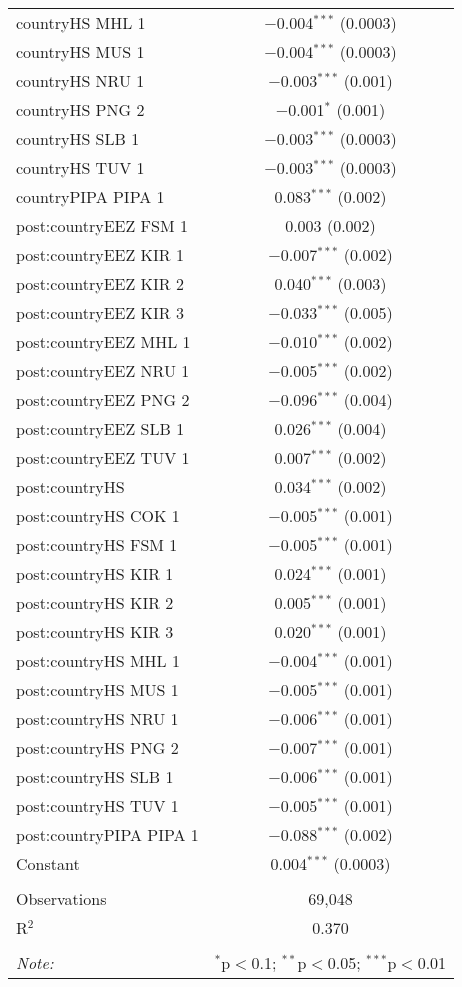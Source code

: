 \documentclass[11pt,]{article}
\begin{document}
\begin{table}[!htbp]
\begin{tabular}{@{\extracolsep{5pt}}lc}
  countryHS MHL 1 & $-$0.004$^{***}$ (0.0003) \\ 
  countryHS MUS 1 & $-$0.004$^{***}$ (0.0003) \\ 
  countryHS NRU 1 & $-$0.003$^{***}$ (0.001) \\ 
  countryHS PNG 2 & $-$0.001$^{*}$ (0.001) \\ 
  countryHS SLB 1 & $-$0.003$^{***}$ (0.0003) \\ 
  countryHS TUV 1 & $-$0.003$^{***}$ (0.0003) \\ 
  countryPIPA PIPA 1 & 0.083$^{***}$ (0.002) \\ 
  post:countryEEZ FSM 1 & 0.003 (0.002) \\ 
  post:countryEEZ KIR 1 & $-$0.007$^{***}$ (0.002) \\ 
  post:countryEEZ KIR 2 & 0.040$^{***}$ (0.003) \\ 
  post:countryEEZ KIR 3 & $-$0.033$^{***}$ (0.005) \\ 
  post:countryEEZ MHL 1 & $-$0.010$^{***}$ (0.002) \\ 
  post:countryEEZ NRU 1 & $-$0.005$^{***}$ (0.002) \\ 
  post:countryEEZ PNG 2 & $-$0.096$^{***}$ (0.004) \\ 
  post:countryEEZ SLB 1 & 0.026$^{***}$ (0.004) \\ 
  post:countryEEZ TUV 1 & 0.007$^{***}$ (0.002) \\ 
  post:countryHS & 0.034$^{***}$ (0.002) \\ 
  post:countryHS COK 1 & $-$0.005$^{***}$ (0.001) \\ 
  post:countryHS FSM 1 & $-$0.005$^{***}$ (0.001) \\ 
  post:countryHS KIR 1 & 0.024$^{***}$ (0.001) \\ 
  post:countryHS KIR 2 & 0.005$^{***}$ (0.001) \\ 
  post:countryHS KIR 3 & 0.020$^{***}$ (0.001) \\ 
  post:countryHS MHL 1 & $-$0.004$^{***}$ (0.001) \\ 
  post:countryHS MUS 1 & $-$0.005$^{***}$ (0.001) \\ 
  post:countryHS NRU 1 & $-$0.006$^{***}$ (0.001) \\ 
  post:countryHS PNG 2 & $-$0.007$^{***}$ (0.001) \\ 
  post:countryHS SLB 1 & $-$0.006$^{***}$ (0.001) \\ 
  post:countryHS TUV 1 & $-$0.005$^{***}$ (0.001) \\ 
  post:countryPIPA PIPA 1 & $-$0.088$^{***}$ (0.002) \\ 
  Constant & 0.004$^{***}$ (0.0003) \\ 
 \hline \\[-1.8ex] 
Observations & 69,048 \\ 
R$^{2}$ & 0.370 \\ 
\hline 
\hline \\[-1.8ex] 
\textit{Note:}  & \multicolumn{1}{r}{$^{*}$p$<$0.1; $^{**}$p$<$0.05; $^{***}$p$<$0.01} \\ 
\end{tabular} 
\end{table}
\end{document}

